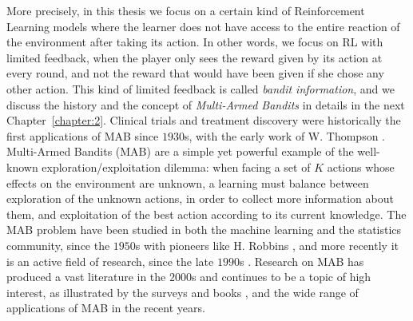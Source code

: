 More precisely, in this thesis we focus on a certain kind of Reinforcement Learning models where the learner does not have access to the entire reaction of the environment after taking its action.
In other words, we focus on RL with limited feedback, when the player only sees the reward given by its action at every round, and not the reward that would have been given if she chose any other action.
This kind of limited feedback is called \emph{bandit information}, and we discuss the history and the concept of \emph{Multi-Armed Bandits} in details in the next Chapter~\ref{chapter:2}.
Clinical trials and treatment discovery were historically the first applications of MAB since $1930$s, with the early work of W. Thompson \cite{Thompson33}.
%
Multi-Armed Bandits (MAB) are a simple yet powerful example of the well-known exploration/exploitation dilemma:
when facing a set of $K$ actions whose effects on the environment are unknown, a learning must balance between
exploration of the unknown actions, in order to collect more information about them,
and exploitation of the best action according to its current knowledge.
%
The MAB problem have been studied in both the machine learning and the statistics community, since the $1950$s with pioneers like H. Robbins \cite{Robbins52}, and more recently it is an active field of research, since the late $1990$s \cite{Anantharam87a,Anantharam87b,auer1995gambling,Agrawal95}.
Research on MAB has produced a vast literature in the $2000$s \cite{Auer02,Auer02NonStochastic,Audibert2009minimax} and continues to be a topic of high interest, as illustrated by the surveys and books \cite{Bubeck12,LattimoreBanditAlgorithmsBook,Slivkins2019}, and the wide range of applications of MAB in the recent years.


